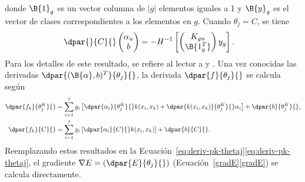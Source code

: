 %
donde $\B{1}_g$ es un vector columna de $|g|$ elementos iguales a 1 y
$\B{y}_g$ es el vector de clases correspondientes a los elementos en
$g$.
Cuando $\theta_j = C$, se tiene
%
\begin{align}
  \dpar{}{C}{} \begin{pmatrix}\alpha_{u}\\b\end{pmatrix} &=
    -H^{-1} \left[
      \begin{pmatrix}{K_{gu}}\\\B{1_g^T}\end{pmatrix} y_g
      \right].
\end{align}
%
Para los detalles de este resultado, se refiere al lector a
\cite{glasmachers} y \cite{keerthi}.
Una vez conocidas las derivadas
$\dpar{({\B{\alpha},b})^T}{\theta_j}{}$, la derivada
$\dpar{f}{\theta_j}{}$ se calcula según
%
\begin{align}
  \dpar{f_k}{\theta^K_j}{} &=  \sum_{i=1}^l y_i \left[
    \dpar{\alpha_i}{\theta^K_j}{} k(x_i,x_k) +
    \dpar{k(x_i,x_k)}{\theta^K_j}{} \alpha_i \right]
  + \dpar{b}{\theta^K_j}{}, \\
    \dpar{f_k}{C}{} &=  \sum_{i=1}^l y_i\left[
    \dpar{\alpha_i}{C}{} k(x_i,x_k) \right]
  + \dpar{b}{C}{}.
\end{align}
%
Reemplazando estos resultados en la
\iflatexml{}Ecuación~\ref{eq:deriv-pk-thetaj}\else\autoref{eq:deriv-pk-thetaj}\fi{},
el gradiente $\nabla{}E=\left(\dpar{E}{\theta_j}{}\right)$
(\iflatexml{}Ecuación~\ref{gradE}\else\autoref{gradE}\fi{}) se calcula
directamente.
